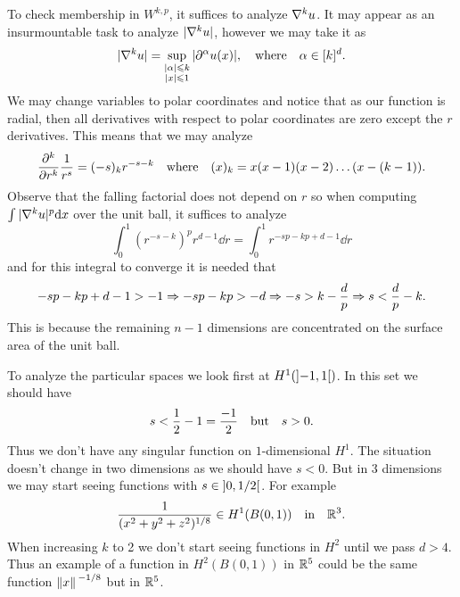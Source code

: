 \documentclass[12pt]{memoir}
\begin{document}
\begin{ptcbr}
To check membership in $W^{k,p}$, it suffices to analyze $\nabla^k u$. It may appear as an insurmountable task to analyze $|\nabla^k u|$, however we may take it as 
$$|\nabla^k u|=\sup_{\substack{|\alpha|\leqslant k\\ |x|\leqslant 1}}|\partial^\alpha u(x)|,\quad\text{where}\quad\alpha\in[k]^d.$$
We may change variables to polar coordinates and notice that as our function is radial, then all derivatives with respect to polar coordinates are zero except the $r$ derivatives. This means that we may analyze 
$$\pdv[k]{r}\frac{1}{r^s}=(-s)_kr^{-s-k}\quad\text{where}\quad(x)_k=x(x-1)(x-2)\dots(x-(k-1)).$$
Observe that the falling factorial does not depend on $r$ so when computing $\int|\nabla^k u|^p\dd x$ over the unit ball, it suffices to analyze
$$\int_0^1(r^{-s-k})^pr^{d-1}\dd r=\int_0^1r^{-sp-kp+d-1}\dd r$$
and for this integral to converge it is needed that 
$$-sp-kp+d-1>-1\Rightarrow-sp-kp>-d\Rightarrow -s>k-\frac{d}{p}\Rightarrow s<\frac{d}{p}-k.$$
This is because the remaining $n-1$ dimensions are concentrated on the surface area of the unit ball.\par 
To analyze the particular spaces we look first at $H^1(\left\rbrack-1,1\right\lbrack)$. In this set we should have 
$$s<\frac{1}{2}-1=\frac{-1}{2}\quad\text{but}\quad s>0.$$
Thus we don't have any singular function on $1$-dimensional $H^1$. The situation doesn't change in two dimensions as we should have $s<0$. But in 3 dimensions we may start seeing functions with $s\in\left\rbrack0,1/2\right\lbrack$. For example
$$\frac{1}{(x^2+y^2+z^2)^{1/8}}\in H^1(B(0,1))\quad\text{in}\quad\mathbb{R}^3.$$
When increasing $k$ to 2 we don't start seeing functions in $H^2$ until we pass $d>4$. Thus an example of a function in $H^2(B(0,1))$ in $\mathbb{R}^5$ could be the same function $\norm*{x}^{-1/8}$ but in $\mathbb{R}^5$.
\end{ptcbr}
\end{document}
